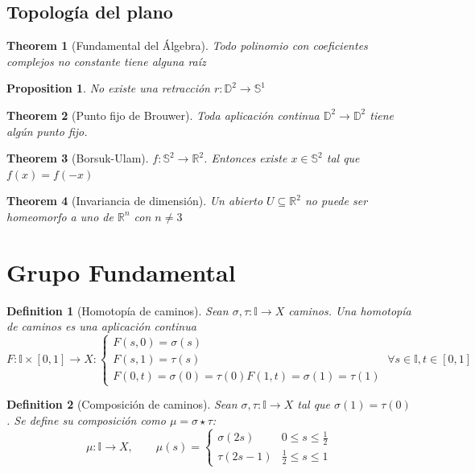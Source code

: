 \documentclass{myclass}
\newtheorem*{definition}{Definition}
\newtheorem*{theorem}{Theorem}
\newtheorem*{proposition}{Proposition}
\begin{document}
\subsection{Topología del plano}
\begin{theorem}[Fundamental del Álgebra] Todo polinomio con coeficientes complejos no constante tiene alguna raíz
\end{theorem}

\begin{proposition}
No existe una retracción $r:\mathbb{D}^2 \to \mathbb{S}^1$
\end{proposition}

\begin{theorem}[Punto fijo de Brouwer]
Toda aplicación continua $\mathbb{D}^2 \to \mathbb{D}^2$ tiene algún punto fijo.
\end{theorem}

\begin{theorem}[Borsuk-Ulam]
$f: \mathbb{S}^2 \to \mathbb{R}^2 $. Entonces existe $x \in \mathbb{S}^2$ tal que $f(x) = f(-x)$
\end{theorem}

\begin{theorem}[Invariancia de dimensión]
Un abierto $U\subseteq \mathbb{R}^2$ no puede ser homeomorfo a uno de $\mathbb{R}^n$ con $n\neq 3$
\end{theorem}



\section{Grupo Fundamental}
\begin{definition}[Homotopía de caminos]
  Sean $\sigma , \tau : \mathbb{I} \to X$ caminos. Una homotopía de caminos es una aplicación continua 
  \[
  F:\mathbb{I}\times [0, 1] \to  X : \begin{cases}
    F(s, 0) = \sigma (s) \\
	F(s, 1) = \tau (s) \\
    F(0, t) = \sigma(0) = \tau (0)
    F(1, t) = \sigma(1) = \tau (1)
  \end{cases} \ \forall s \in \mathbb{I}, t \in [0,1]
  \] 
\end{definition}

\begin{definition}[Composición de caminos] Sean $\sigma , \tau : \mathbb{I} \to X $ tal que $\sigma (1) = \tau (0)$. Se define su composición como $\mu = \sigma \star \tau $:
  \[
  \mu: \mathbb{I} \to X, \qquad \mu(s) = \begin{cases}
	\sigma (2s) & 0\le s\le \frac{1}{2} \\
	\tau (2s-1) & \frac{1}{2} \le s\le 1
  \end{cases}
  \] 

\end{definition}
\end{document}
